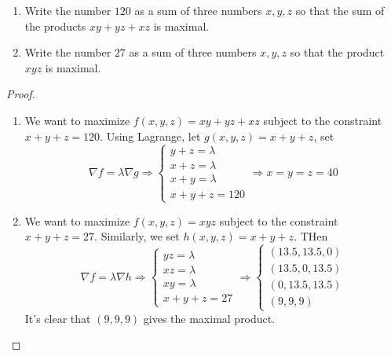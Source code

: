 \documentclass[openany]{book}
\begin{document}
\begin{prob}
    \begin{enumerate}
        \item Write the number $120$ as a sum of three numbers $x,y,z$ so that the sum of the products $xy+yz+xz$ is maximal.
        \item Write the number $27$ as a sum of three numbers $x,y,z$ so that the product $xyz$ is maximal.
    \end{enumerate}
\end{prob}
\begin{proof}
    \begin{enumerate}
        \item We want to maximize $f(x,y,z)=xy+yz+xz$ subject to the constraint $x+y+z=120$. Using Lagrange, let $g(x,y,z)=x+y+z$, set
        \begin{equation*}
            \nabla f=\lambda\nabla g\Rightarrow\begin{cases}
                y+z=\lambda\\
                x+z=\lambda\\
                x+y=\lambda\\
                x+y+z=120
            \end{cases}\Rightarrow x=y=z=40
        \end{equation*}
        \item We want to maximize $f(x,y,z)=xyz$ subject to the constraint $x+y+z=27$. Similarly, we set $h(x,y,z)=x+y+z$. THen 
        \begin{equation*}
            \nabla f=\lambda\nabla h\Rightarrow\begin{cases}
                yz=\lambda\\
                xz=\lambda\\
                xy=\lambda\\
                x+y+z=27
            \end{cases}\Rightarrow \begin{cases}
                (13.5, 13.5, 0)\\
                (13.5, 0, 13.5)\\
                (0, 13.5, 13.5)\\
                (9,9,9)
            \end{cases}
        \end{equation*}
        It's clear that $(9,9,9)$ gives the maximal product.
    \end{enumerate}
\end{proof}
\end{document}

